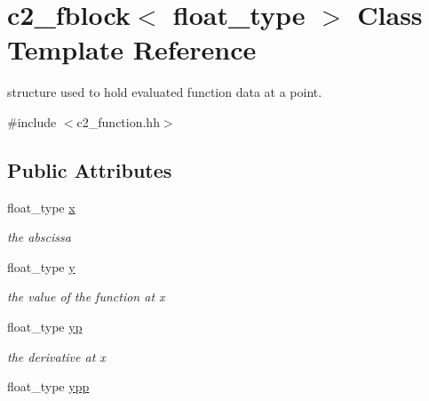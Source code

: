 \hypertarget{classc2__fblock}{\section{c2\-\_\-fblock$<$ float\-\_\-type $>$ Class Template Reference}
\label{classc2__fblock}
}


structure used to hold evaluated function data at a point.  




{\ttfamily \#include $<$c2\-\_\-function.\-hh$>$}

\subsection*{Public Attributes}
\begin{DoxyCompactItemize}
\item 
\hypertarget{classc2__fblock_ad5560516bfc794724226af6d3678d518}{float\-\_\-type \hyperlink{classc2__fblock_ad5560516bfc794724226af6d3678d518}{x}}\label{classc2__fblock_ad5560516bfc794724226af6d3678d518}

\begin{DoxyCompactList}\small\item\em the abscissa \end{DoxyCompactList}\item 
\hypertarget{classc2__fblock_a0de289aaf1b624af8cb1461164ea0dfd}{float\-\_\-type \hyperlink{classc2__fblock_a0de289aaf1b624af8cb1461164ea0dfd}{y}}\label{classc2__fblock_a0de289aaf1b624af8cb1461164ea0dfd}

\begin{DoxyCompactList}\small\item\em the value of the function at {\itshape x} \end{DoxyCompactList}\item 
\hypertarget{classc2__fblock_a4df4413818bad95cd88e33d29fa7334e}{float\-\_\-type \hyperlink{classc2__fblock_a4df4413818bad95cd88e33d29fa7334e}{yp}}\label{classc2__fblock_a4df4413818bad95cd88e33d29fa7334e}

\begin{DoxyCompactList}\small\item\em the derivative at {\itshape x} \end{DoxyCompactList}\item 
\hypertarget{classc2__fblock_aad33c0adbb2d83549139ab8e9f69c0d3}{float\-\_\-type \hyperlink{classc2__fblock_aad33c0adbb2d83549139ab8e9f69c0d3}{ypp}}\label{classc2__fblock_aad33c0adbb2d83549139ab8e9f69c0d3}


\end{DoxyCompactItemize}
